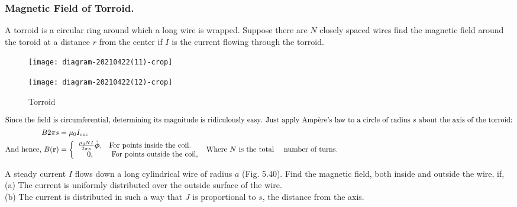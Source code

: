 \subsubsection{Magnetic Field of Torroid. }
A torroid is a circular ring around which a long wire is wrapped. Suppose there are $N$ closely spaced wires find the magnetic field around the toroid at a distance $r$ from the center if $I$ is the current flowing through the torroid.
\begin{figure}[H]
\begin{minipage}{0.45\textwidth}
	\texttt{[image: diagram-20210422(11)-crop]}
\end{minipage}
\begin{minipage}{0.45\textwidth}
		\texttt{[image: diagram-20210422(12)-crop]}
\end{minipage}
\caption{Torroid}
\end{figure}
\begin{align*}
\intertext{Since the field is circumferential, determining its magnitude is ridiculously easy. Just apply Ampère's law to a circle of radius $s$ about the axis of the torroid:}
B 2 \pi s&=\mu_{0} I_{\text {enc }}\\
\text{And hence,}\ {B}(\mathbf{r})&=\left\{\begin{array}{cl}
\frac{\mu_{0} N I}{2 \pi s} \hat{\boldsymbol{\phi}}, & \text {For points inside the coil. } \\
0, & \text { For points outside the coil, }
\end{array}\right.
\text{Where $N$ is the total}&\text{ number of turns.}
\end{align*}
\begin{exercise}
	 A steady current $I$ flows down a long cylindrical wire of radius $a$ (Fig. 5.40). Find the magnetic field, both inside and outside the wire, if,
	\\(a) The current is uniformly distributed over the outside surface of the wire.
	\\(b) The current is distributed in such a way that $J$ is proportional to $s$, the distance from the axis.
\end{exercise}
